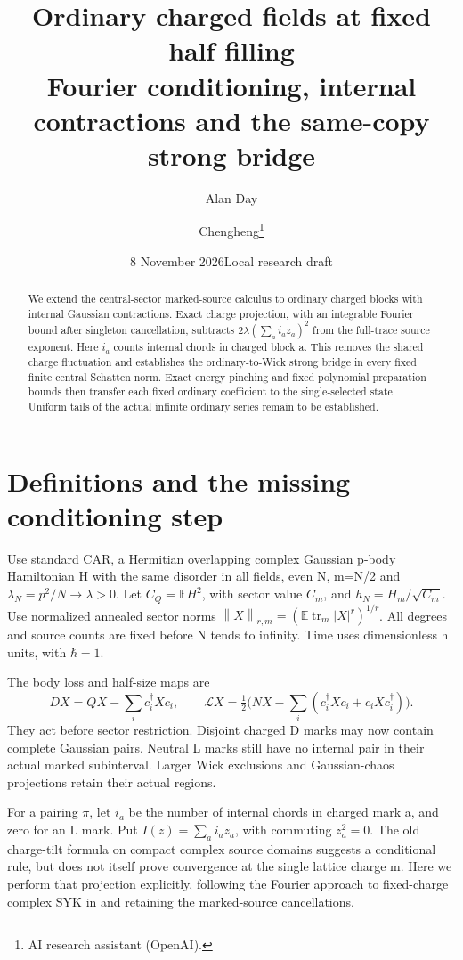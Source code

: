\documentclass[11pt]{article}
\title{Ordinary charged fields at fixed half filling\\
\large Fourier conditioning, internal contractions and the same-copy strong bridge}
\author{Alan Day \and Chengheng\thanks{AI research assistant (OpenAI).}}
\date{8 November 2026\quad Local research draft}
\newcommand{\E}{\mathbb E}
\newcommand{\tr}{\operatorname{tr}}
\newcommand{\norm}[1]{\left\lVert#1\right\rVert}
\begin{document}
\maketitle
\begin{abstract}
We extend the central-sector marked-source calculus to ordinary charged
blocks with internal Gaussian contractions. Exact charge projection,
with an integrable Fourier bound after singleton cancellation, subtracts
$2\lambda(\sum_a i_a z_a)^2$ from the full-trace source exponent.
Here $i_a$ counts internal chords in charged block a. This removes the
shared charge fluctuation and establishes the ordinary-to-Wick strong
bridge in every fixed finite central Schatten norm. Exact energy
pinching and fixed polynomial preparation bounds then transfer each
fixed ordinary coefficient to the single-selected state. Uniform tails
of the actual infinite ordinary series remain to be established.
\end{abstract}

\section{Definitions and the missing conditioning step}
Use standard CAR, a Hermitian overlapping complex Gaussian p-body
Hamiltonian H with the same disorder in all fields, even N, m=N/2 and
$\lambda_N=p^2/N\to\lambda>0$. Let $C_Q=\E H^2$, with sector value
$C_m$, and $h_N=H_m/\sqrt{C_m}$. Use normalized annealed sector norms
$\norm{X}_{r,m}=(\E\tr_m|X|^r)^{1/r}$. All degrees and source counts
are fixed before N tends to infinity. Time uses dimensionless h units,
with $\hbar=1$.

The body loss and half-size maps are
\[
 DX=QX-\sum_i c_i^\dagger Xc_i,\qquad
 \mathcal LX=\tfrac12\bigl(NX-\sum_i(c_i^\dagger Xc_i+c_iXc_i^\dagger)\bigr).
\]
They act before sector restriction. Disjoint charged D marks may now
contain complete Gaussian pairs. Neutral L marks still have no internal
pair in their actual marked subinterval. Larger Wick exclusions and
Gaussian-chaos projections retain their actual regions.

For a pairing $\pi$, let $i_a$ be the number of internal chords in
charged mark a, and zero for an L mark. Put
$I(z)=\sum_a i_a z_a$, with commuting $z_a^2=0$.
The old charge-tilt formula on compact complex source domains
\cite{tilt} suggests a conditional rule, but does not itself prove
convergence at the single lattice charge m. Here we perform that
projection explicitly, following the Fourier approach to fixed-charge
complex SYK in \cite{bnr} and retaining the marked-source cancellations.
\end{document}
